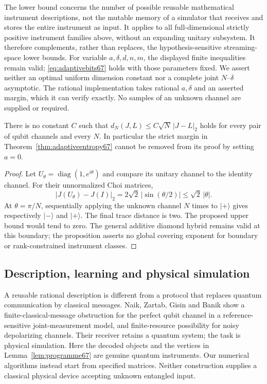 \begin{remark}\label{rem:adaptivescope67}
The lower bound concerns the number of possible reusable mathematical
instrument descriptions, not the mutable memory of a simulator that
receives and stores the entire instrument as input. It applies to all
full-dimensional strictly positive instrument families above, without
an expanding unitary subsystem. It therefore complements, rather than
replaces, the hypothesis-sensitive streaming-space lower bounds.
For variable $a,\delta,d,n,m$, the displayed finite inequalities remain
valid; \eqref{eq:adaptivebits67} holds with those parameters fixed.
We assert neither an optimal uniform dimension constant nor a complete
joint $N$--$\delta$ asymptotic. The rational implementation takes
rational $a,\delta$ and an asserted margin, which it can verify exactly.
No samples of an unknown channel are supplied or required.
\end{remark}

\begin{proposition}\label{prop:boundaryphase67}
There is no constant $C$ such that
$d_N(J,L)\le C\sqrt N\,|J-L|_2$ holds for every pair of qubit channels
and every $N$. In particular the strict margin in
Theorem~\ref{thm:adaptiveentropy67} cannot be removed from its proof by
setting $a=0$.
\end{proposition}
\begin{proof}
Let $U_\theta=\operatorname{diag}(1,e^{i\theta})$ and compare its
unitary channel to the identity channel. For their unnormalized Choi
matrices,
\[
 |J(U_\theta)-J(I)|_2
       =2\sqrt2\,|\sin(\theta/2)|\le\sqrt2\,|\theta|.
\]
At $\theta=\pi/N$, sequentially applying the unknown channel $N$
times to $|+\rangle$ gives respectively $|-\rangle$ and $|+\rangle$.
The final trace distance is two. The proposed upper bound would tend
to zero. The general additive diamond hybrid remains valid at this
boundary; the proposition asserts no global covering exponent for
boundary or rank-constrained instrument classes.
\end{proof}

\subsection{Description, learning and physical simulation}
A reusable rational description is different from a protocol that
replaces quantum communication by classical messages.
Naik, Zartab, Gisin and Banik \cite[Theorems~2 and~5]{NZGB67} show a
finite-classical-message obstruction for the perfect qubit channel in
a reference-sensitive joint-measurement model, and finite-resource
possibility for noisy depolarizing channels. Their receiver retains a
quantum system; the task is physical simulation. Here the decoded
objects and the vertices in Lemma~\ref{lem:programme67} are genuine
quantum instruments. Our numerical algorithms instead start from
specified matrices. Neither construction supplies a classical physical
device accepting unknown entangled input.

